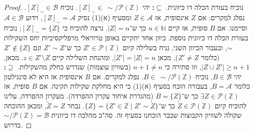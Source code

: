 \documentclass[]{article}
\newcommand\N     {\mathbb{N}}
\newcommand\Z     {\mathbb{Z}}
\newcommand\ps    {\mathcal{P}}
\newcommand\ac    {\mathcal{A}}
\newcommand\bc    {\mathcal{B}}
\newcommand\tl    {\tilde}
\begin{document}
\begin{enumerate}[(a)]
\begin{proof}
			נוכיח בעזרת הכלה דו כיוונית. $ \bm{\subseteq} $\textbf{: }יהי $ [Z]_\sim \in \ \sim / \ps(\Z) $. נוכיח $ [Z]_\sim \in \bc $. נפלג למקרים: אם $ Z $ אינסופית, אז $ Z \in \ac $ ומסעיף (א)(1) נסיק $ [Z]_\sim = \ac $, וידוע $ \ac \in \bc $ וסיימנו. אם $ B $ סופית, אז קיים $ n \in \N $ כך ש־$ |Z| = n $. נרצה להוכיח כי $ [Z]_\sim = \{Z\} $; נוכיח בעזרת הכלה דו כיוונית נוספת. כיוון אחד יתקיים באופן טרוויאלי מרפליקסיביות יחס השקילות $ \sim $, ובעבור הכיוון השני, נניח בשלילה קיום $ Z' \in \ps(\Z) $ כך ש־$ Z' \sim Z $ וגם $ Z' \not \in \{Z\} $ (כלומר $ Z' \neq Z $), מכאן $ |Z'| = |Z| = n $, ומהנחת השלילה קיים $ z \in Z' \setminus Z $. מכאן, $ |Z \cup Z'| \ge n + 1 $, וזו סתירה כי $ n + 1 \neq n $ (בשוויון עוצמות) שנדרש כחלק מהשקילות. $ \bm{\supseteq} $\textbf{: }יהי $ B \in \bc $, נוכיח $ B \in \ \sim/\ps(\Z) $. נפלג למקרים. אם $ B $ אינסופית אז היא לא סינגילטון כלומר $ B = \ac $, בעבורה הוכח בסעיף (א)(1) כי היא מחלקת שקילות תקינה. אם $ B $ סופית, אז $ \exists Z \in \ps(\Z) $ כך ש־$ B = \{Z\} $ (מהגדרת איחוד עקרון ההפרדה). מעקרון ההפרדה, עלינו להוכיח קיום $ \tl Z \in \ps(\Z) $ כך ש־$ \{Z\} = \{Z' \in \Z \mid Z' \sim \tl Z\} $. נבחר $ \tl Z = Z $, ומכאן ההוכחה שקולה לשוויון הקבוצות שכבר הוכחנו בסעיף זה. סה"כ מהלכה דו כיוונית $ \sim / \ps(\Z) = \bc $ כדרוש. 
			

\end{proof}
\end{enumerate}
\end{document}

